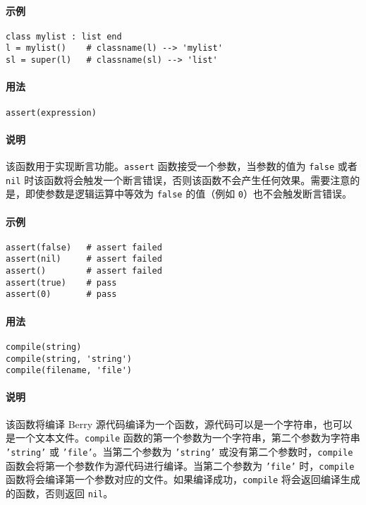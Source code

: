 \paragraph{示例}
\begin{lstlisting}[language=berry, numbers=none]
class mylist : list end
l = mylist()    # classname(l) --> 'mylist'
sl = super(l)   # classname(sl) --> 'list'
\end{lstlisting}


\paragraph{用法}
\begin{lstlisting}[language=berry, numbers=none]
assert(expression)
\end{lstlisting}

\paragraph{说明}
该函数用于实现断言功能。\texttt{assert} 函数接受一个参数，当参数的值为 \texttt{false} 或者 \texttt{nil} 时该函数将会触发一个断言错误，否则该函数不会产生任何效果。需要注意的是，即使参数是逻辑运算中等效为 \texttt{false} 的值（例如 \texttt{0}）也不会触发断言错误。

\paragraph{示例}
\begin{lstlisting}[language=berry, numbers=none]
assert(false)   # assert failed
assert(nil)     # assert failed
assert()        # assert failed
assert(true)    # pass
assert(0)       # pass
\end{lstlisting}


\paragraph{用法}
\begin{lstlisting}[language=berry, numbers=none]
compile(string)
compile(string, 'string')
compile(filename, 'file')
\end{lstlisting}

\paragraph{说明}
该函数将编译 Berry 源代码编译为一个函数，源代码可以是一个字符串，也可以是一个文本文件。\texttt{compile} 函数的第一个参数为一个字符串，第二个参数为字符串 \texttt{'string'} 或 \texttt{'file'}。当第二个参数为 \texttt{'string'} 或没有第二个参数时，\texttt{compile} 函数会将第一个参数作为源代码进行编译。当第二个参数为 \texttt{'file'} 时，\texttt{compile} 函数将会编译第一个参数对应的文件。如果编译成功，\texttt{compile} 将会返回编译生成的函数，否则返回 \texttt{nil}。

